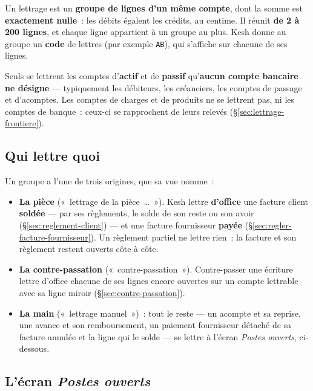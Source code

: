 \documentclass[a4paper,11pt,oneside]{article}
\begin{document}
Un lettrage est un \textbf{groupe de lignes d'un même compte}, dont la somme est
\textbf{exactement nulle}~: les débits égalent les crédits, au centime. Il réunit
\textbf{de 2 à 200 lignes}, et chaque ligne appartient à un groupe au plus. Kesh donne au
groupe un \textbf{code} de lettres (par exemple \texttt{AB}), qui s'affiche sur chacune
de ses lignes.

Seuls se lettrent les comptes d'\textbf{actif} et de \textbf{passif} qu'\textbf{aucun compte
bancaire ne désigne} --- typiquement les débiteurs, les créanciers, les comptes de passage et
d'acomptes. Les comptes de charges et de produits ne se lettrent pas, ni les comptes de banque~:
ceux-ci se rapprochent de leurs relevés (\S\ref{sec:lettrage-frontiere}).

\subsection{Qui lettre quoi}

Un groupe a l'une de trois origines, que sa vue nomme~:

\begin{itemize}
    \item \textbf{La pièce} («~lettrage de la pièce~\ldots~»). Kesh lettre \textbf{d'office} une
          facture client \textbf{soldée} --- par ses règlements, le solde de son reste ou son
          avoir (\S\ref{sec:reglement-client}) --- et une facture fournisseur
          \textbf{payée} (\S\ref{sec:regler-facture-fournisseur}). Un règlement partiel ne
          lettre rien~: la facture et son règlement restent ouverts côte à côte.
    \item \textbf{La contre-passation} («~contre-passation~»). Contre-passer une écriture lettre
          d'office chacune de ses lignes encore ouvertes sur un compte lettrable avec sa ligne
          miroir (\S\ref{sec:contre-passation}).
    \item \textbf{La main} («~lettrage manuel~»)~: tout le reste --- un acompte et sa reprise,
          une avance et son remboursement, un paiement fournisseur détaché de sa facture
          annulée et la ligne qui le solde --- se lettre à l'écran \emph{Postes ouverts},
          ci-dessous.
\end{itemize}

\subsection{L'écran \emph{Postes ouverts}}
\end{document}
